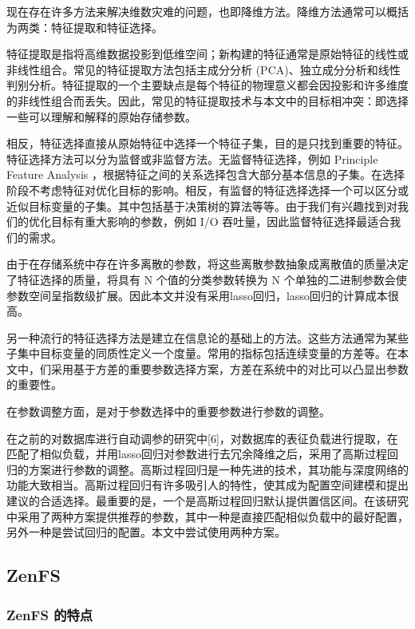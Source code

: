 现在存在许多方法来解决维数灾难的问题，也即降维方法。降维方法通常可以概括为两类：特征提取和特征选择。

特征提取是指将高维数据投影到低维空间；新构建的特征通常是原始特征的线性或非线性组合。常见的特征提取方法包括主成分分析 (PCA)、独立成分分析和线性判别分析。特征提取的一个主要缺点是每个特征的物理意义都会因投影和许多维度的非线性组合而丢失。因此，常见的特征提取技术与本文中的目标相冲突：即选择一些可以理解和解释的原始存储参数。

相反，特征选择直接从原始特征中选择一个特征子集，目的是只找到重要的特征。特征选择方法可以分为监督或非监督方法。无监督特征选择，例如 Principle Feature Analysis ，根据特征之间的关系选择包含大部分基本信息的子集。在选择阶段不考虑特征对优化目标的影响。相反，有监督的特征选择选择一个可以区分或近似目标变量的子集。其中包括基于决策树的算法等等。由于我们有兴趣找到对我们的优化目标有重大影响的参数，例如 I/O 吞吐量，因此监督特征选择最适合我们的需求。

由于在存储系统中存在许多离散的参数，将这些离散参数抽象成离散值的质量决定了特征选择的质量，将具有 N 个值的分类参数转换为 N 个单独的二进制参数会使参数空间呈指数级扩展。因此本文并没有采用lasso回归，lasso回归的计算成本很高。

另一种流行的特征选择方法是建立在信息论的基础上的方法。这些方法通常为某些子集中目标变量的同质性定义一个度量。常用的指标包括连续变量的方差等。在本文中，们采用基于方差的重要参数选择方案，方差在系统中的对比可以凸显出参数的重要性。

在参数调整方面，是对于参数选择中的重要参数进行参数的调整。

在之前的对数据库进行自动调参的研究中[6]，对数据库的表征负载进行提取，在匹配了相似负载，并用lasso回归对参数进行去冗余降维之后，采用了高斯过程回归的方案进行参数的调整。高斯过程回归是一种先进的技术，其功能与深度网络的功能大致相当。高斯过程回归有许多吸引人的特性，使其成为配置空间建模和提出建议的合适选择。最重要的是，一个是高斯过程回归默认提供置信区间。在该研究中采用了两种方案提供推荐的参数，其中一种是直接匹配相似负载中的最好配置，另外一种是尝试回归的配置。本文中尝试使用两种方案。

\subsection{ZenFS}
\label{chap:zenfs}

\subsubsection{ZenFS 的特点}

